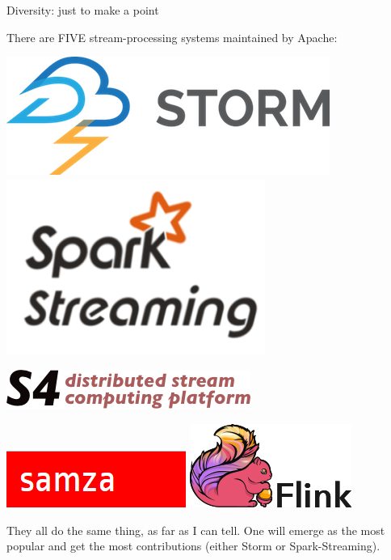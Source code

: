 \documentclass{beamer}
\begin{document}
\begin{frame}{Diversity: just to make a point}

There are FIVE stream-processing systems maintained by Apache:

\begin{center}
\begin{minipage}{0.8\linewidth}
\begin{center}
\includegraphics[width=0.4\linewidth]{streaming-1.png} \hfill
\includegraphics[width=0.4\linewidth]{streaming-2.png}

\vspace{0.2 cm}
\includegraphics[width=0.5\linewidth]{streaming-3.png}

\vspace{0.2 cm}
\includegraphics[width=0.4\linewidth]{streaming-4.png} \hfill
\includegraphics[width=0.4\linewidth]{streaming-5.jpg}
\end{center}
\end{minipage}
\end{center}

\vfill
They all do the same thing, as far as I can tell. One will emerge as the most popular and get the most contributions (either Storm or Spark-Streaming).
\end{frame}
\end{document}
